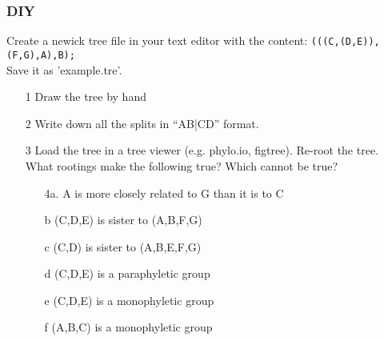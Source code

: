\documentclass{beamer}
\begin{document}
\begin{frame}
\frametitle{DIY}
Create a newick tree file in your text editor with the content:
\texttt{(((C,(D,E)),(F,G),A),B);}\\
Save it as 'example.tre'.\\
\begin{itemize}
 \item[1] Draw the tree by hand
 \item[2] Write down all the splits in ``AB|CD'' format.
 \item[3] Load the tree in a tree viewer (e.g. phylo.io, figtree). Re-root  the tree. What rootings make the following true? Which cannot be true?
 \begin{itemize}
 \item[4a.] A is more closely related to G than it is to C
 \item[b] (C,D,E) is sister to (A,B,F,G)
 \item[c] (C,D) is sister to (A,B,E,F,G)
 \item[d] (C,D,E) is a paraphyletic group
 \item[e] (C,D,E) is a monophyletic group
 \item[f] (A,B,C) is a monophyletic group
 \end{itemize}
\end{itemize}
\end{frame}
\end{document}
